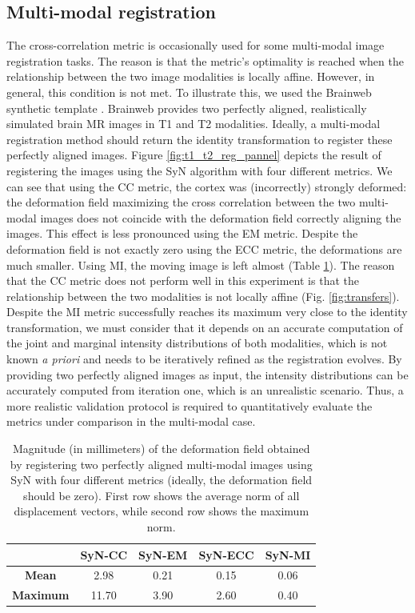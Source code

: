 \subsection{Multi-modal registration}\label{sec:multimodal_results}
The cross-correlation metric is occasionally used for some multi-modal image registration tasks. The reason is that the metric's optimality is reached when the relationship between the two image modalities is locally affine. However, in general, this condition is not met. To illustrate this, we used the Brainweb synthetic template \citep{Cocosco1997, Kwan1999}. Brainweb provides two perfectly aligned, realistically simulated brain MR images in T1 and T2 modalities. Ideally, a multi-modal registration method should return the identity transformation to register these perfectly aligned images. Figure \ref{fig:t1_t2_reg_pannel} depicts the result of registering the images using the SyN algorithm with four different metrics. We can see that using the CC metric, the cortex was (incorrectly) strongly deformed: the deformation field maximizing the cross correlation between the two multi-modal images does not coincide with the deformation field correctly aligning the images. This effect is less pronounced using the EM metric. Despite the deformation field is not exactly zero using the ECC metric, the deformations are much smaller. Using MI, the moving image is left almost (Table \ref{tab:deformation_magnitude}). The reason that the CC metric does not perform well in this experiment is that the relationship between the two modalities is not locally affine (Fig. \ref{fig:transfers}). Despite the MI metric successfully reaches its maximum very close to the identity transformation, we must consider that it depends on an accurate computation of the joint and marginal intensity distributions of both modalities, which is not known {\it a priori} and needs to be iteratively refined as the registration evolves. By providing two perfectly aligned images as input, the intensity distributions can be accurately computed from iteration one, which is an unrealistic scenario. Thus, a more realistic validation protocol is required to quantitatively evaluate the metrics under comparison in the multi-modal case.

\begin{table}[htbp]
  \centering
  {\small
    \begin{tabular}{ccccc}
    \toprule
    \textbf{} & \textbf{SyN-CC} & \textbf{SyN-EM} & \textbf{SyN-ECC} &\textbf{SyN-MI} \\
    \midrule
    \textbf{Mean}    & 2.98  & 0.21 & 0.15 & 0.06 \\
    \textbf{Maximum} & 11.70 & 3.90 & 2.60 & 0.40\\
    \bottomrule
    \end{tabular}%
    \caption{Magnitude (in millimeters) of the deformation field obtained by registering two perfectly aligned multi-modal images using SyN with four different metrics (ideally, the deformation field should be zero). First row shows the average norm of all displacement
    vectors, while second row shows the maximum norm.}
  \label{tab:deformation_magnitude}}%
\end{table}%


